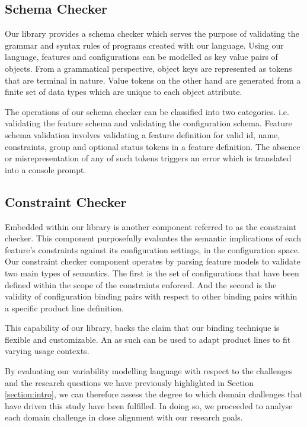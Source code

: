 \documentclass[conference]{IEEEtran}
\begin{document}
  \subsection{Schema Checker} Our library provides a schema checker which serves the purpose of validating the grammar and syntax rules of programs created with our language. Using our language, features and configurations can be modelled as key value pairs of objects. From a grammatical perspective, object keys are represented as tokens that are terminal in nature. Value tokens on the other hand are generated from a finite set of data types which are unique to each object attribute.
  
  The operations of our schema checker can be classified into two categories. i.e. validating the feature schema and validating the configuration schema. Feature schema validation involves validating a feature definition for valid id, name, constraints, group and optional status tokens in a feature definition. The absence or misrepresentation of any of such tokens triggers an error which is translated into a console prompt.
  
  \subsection{Constraint Checker} Embedded within our library is another component referred to as the constraint checker. This component purposefully evaluates the semantic implications of each feature's constraints against its configuration settings, in the configuration space. Our constraint checker component operates by parsing feature models to validate two main types of semantics. The first is the set of configurations that have been defined within the scope of the constraints enforced. And the second is the validity of configuration binding pairs with respect to other binding pairs within a specific product line definition.
  
  This capability of our library, backs the claim that our binding technique is flexible and customizable. An as such can be used to adapt product lines to fit varying usage contexts.


By evaluating our variability modelling language with respect to the challenges and the research questions we have previously highlighted in Section \ref{section:intro}, we can therefore assess the degree to which domain challenges that have driven this study have been fulfilled. In doing so, we proceeded to analyse each domain challenge in close alignment with our research goals.
\end{document}
